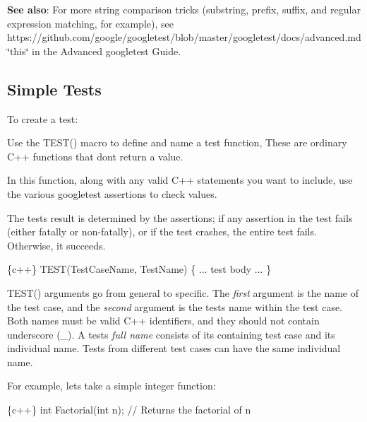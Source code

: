 {\bfseries See also}\+: For more string comparison tricks (substring, prefix, suffix, and regular expression matching, for example), see https\+://github.com/google/googletest/blob/master/googletest/docs/advanced.\+md \char`\"{}this\char`\"{} in the Advanced googletest Guide.

\subsection*{Simple Tests}

To create a test\+:


\begin{DoxyEnumerate}
\item Use the {\ttfamily T\+E\+S\+T()} macro to define and name a test function, These are ordinary C++ functions that don\textquotesingle{}t return a value.
\end{DoxyEnumerate}
\begin{DoxyEnumerate}
\item In this function, along with any valid C++ statements you want to include, use the various googletest assertions to check values.
\end{DoxyEnumerate}
\begin{DoxyEnumerate}
\item The test\textquotesingle{}s result is determined by the assertions; if any assertion in the test fails (either fatally or non-\/fatally), or if the test crashes, the entire test fails. Otherwise, it succeeds.
\end{DoxyEnumerate}


\begin{DoxyCode}
\{c++\}
TEST(TestCaseName, TestName) \{
  ... test body ...
\}
\end{DoxyCode}


{\ttfamily T\+E\+S\+T()} arguments go from general to specific. The {\itshape first} argument is the name of the test case, and the {\itshape second} argument is the test\textquotesingle{}s name within the test case. Both names must be valid C++ identifiers, and they should not contain underscore ({\ttfamily \+\_\+}). A test\textquotesingle{}s {\itshape full name} consists of its containing test case and its individual name. Tests from different test cases can have the same individual name.

For example, let\textquotesingle{}s take a simple integer function\+:


\begin{DoxyCode}
\{c++\}
int Factorial(int n);  // Returns the factorial of n
\end{DoxyCode}


